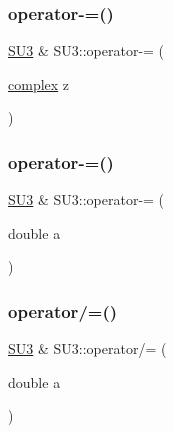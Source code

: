 \subsubsection{\texorpdfstring{operator-\/=()}{operator-=()}\hspace{0.1cm}{\footnotesize\ttfamily [2/3]}}
{\footnotesize\ttfamily \mbox{\hyperlink{class_s_u3}{S\+U3}} \& S\+U3\+::operator-\/= (\begin{DoxyParamCaption}\item[{\mbox{\hyperlink{classcomplex}{complex}}}]{z }\end{DoxyParamCaption})\hspace{0.3cm}{\ttfamily [inline]}}

\mbox{\label{class_s_u3_aaa29d14e952a9b9fcacad15f4a34c6d6}} 
\subsubsection{\texorpdfstring{operator-\/=()}{operator-=()}\hspace{0.1cm}{\footnotesize\ttfamily [3/3]}}
{\footnotesize\ttfamily \mbox{\hyperlink{class_s_u3}{S\+U3}} \& S\+U3\+::operator-\/= (\begin{DoxyParamCaption}\item[{double}]{a }\end{DoxyParamCaption})\hspace{0.3cm}{\ttfamily [inline]}}

\mbox{\label{class_s_u3_a9b49b10ffea08d20b5a89409501ef7d5}} 
\subsubsection{\texorpdfstring{operator/=()}{operator/=()}}
{\footnotesize\ttfamily \mbox{\hyperlink{class_s_u3}{S\+U3}} \& S\+U3\+::operator/= (\begin{DoxyParamCaption}\item[{double}]{a }\end{DoxyParamCaption})\hspace{0.3cm}{\ttfamily [inline]}}

\mbox{\label{class_s_u3_a722bf7fb87348f75132cd1d25922d9f5}} 

